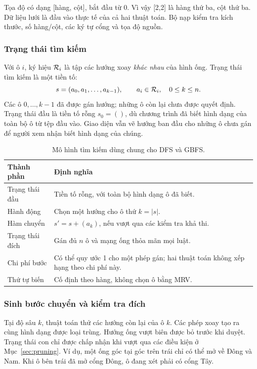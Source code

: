 Tọa độ  có dạng [hàng, cột], bắt đầu từ 0. Vì vậy [2,2] là
hàng thứ ba, cột thứ ba. Dữ liệu lưới là đầu vào thực tế của cả hai thuật toán.
Bộ nạp kiểm tra kích thước, số hàng/cột, các ký tự cổng và tọa độ nguồn.

\subsubsection{Trạng thái tìm kiếm}

Với ô $i$, ký hiệu $\mathcal{R}_i$ là tập các hướng xoay \emph{khác nhau} của hình ống.
Trạng thái tìm kiếm là một tiền tố:
\begin{equation}
s=(a_0,a_1,\ldots,a_{k-1}),\qquad a_i\in\mathcal{R}_i,\quad 0\leq k\leq n.
\label{eq:state}
\end{equation}
Các ô $0,\ldots,k-1$ đã được gán hướng; những ô còn lại chưa được quyết định.
Trạng thái đầu là tiền tố rỗng $s_0=()$, dù chương trình đã biết hình dạng của
toàn bộ ô từ tệp đầu vào. Giao diện vẫn vẽ hướng ban đầu cho những ô chưa gán
để người xem nhận biết hình dạng của chúng.

\begin{table}[H]\centering\small
\begin{tabularx}{\textwidth}{@{}p{}X@{}}\toprule
Thành phần & Định nghĩa \\\midrule
Trạng thái đầu & Tiền tố rỗng, với toàn bộ hình dạng ô đã biết.\\
Hành động & Chọn một hướng cho ô thứ $k=|s|$.\\
Hàm chuyển & $s'=s+(a_k)$, nếu vượt qua các kiểm tra khả thi.\\
Trạng thái đích & Gán đủ $n$ ô và mạng ống thỏa mãn mọi luật.\\
Chi phí bước & Có thể quy ước 1 cho một phép gán; hai thuật toán không xếp hạng theo chi phí này.\\
Thứ tự biến & Cố định theo hàng, không chọn ô bằng MRV.\\\bottomrule
\end{tabularx}
\caption{Mô hình tìm kiếm dùng chung cho DFS và GBFS.}\label{tab:model}
\end{table}

\subsubsection{Sinh bước chuyển và kiểm tra đích}

Tại độ sâu $k$, thuật toán thử các hướng còn lại của ô $k$. Các phép xoay tạo
ra cùng hình dạng được loại trùng. Hướng ống vượt biên được bỏ trước khi duyệt.
Trạng thái con chỉ được chấp nhận khi vượt qua các điều kiện ở
Mục~\ref{sec:pruning}. Ví dụ, một ống góc tại góc trên trái chỉ có thể mở về
Đông và Nam. Khi ô bên trái đã mở cổng Đông, ô đang xét phải có cổng Tây.

